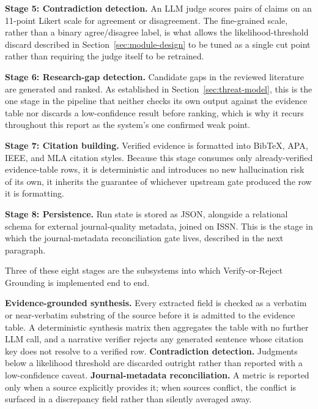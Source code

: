 \documentclass[12pt,a4paper]{report}
\begin{document}
\textbf{Stage 5: Contradiction detection.} An LLM judge scores pairs of
claims on an 11-point Likert scale for agreement or disagreement. The
fine-grained scale, rather than a binary agree/disagree label, is what allows
the likelihood-threshold discard described in Section~\ref{sec:module-design}
to be tuned as a single cut point rather than requiring the judge itself to be
retrained.

\textbf{Stage 6: Research-gap detection.} Candidate gaps in the reviewed
literature are generated and ranked. As established in
Section~\ref{sec:threat-model}, this is the one stage in the pipeline that
neither checks its own output against the evidence table nor discards a
low-confidence result before ranking, which is why it recurs throughout this
report as the system's one confirmed weak point.

\textbf{Stage 7: Citation building.} Verified evidence is formatted into
BibTeX, APA, IEEE, and MLA citation styles. Because this stage consumes only
already-verified evidence-table rows, it is deterministic and introduces no
new hallucination risk of its own, it inherits the guarantee of whichever
upstream gate produced the row it is formatting.

\textbf{Stage 8: Persistence.} Run state is stored as JSON, alongside a
relational schema for external journal-quality metadata, joined on ISSN. This
is the stage in which the journal-metadata reconciliation gate lives,
described in the next paragraph.

Three of these eight stages are the subsystems into which Verify-or-Reject
Grounding is implemented end to end.

\textbf{Evidence-grounded synthesis.} Every extracted field is checked as a
verbatim or near-verbatim substring of the source before it is admitted to the
evidence table. A deterministic synthesis matrix then aggregates the table
with no further LLM call, and a narrative verifier rejects any generated
sentence whose citation key does not resolve to a verified row.
\textbf{Contradiction detection.} Judgments below a likelihood threshold are
discarded outright rather than reported with a low-confidence caveat.
\textbf{Journal-metadata reconciliation.} A metric is reported only when a
source explicitly provides it; when sources conflict, the conflict is surfaced
in a discrepancy field rather than silently averaged away.
\end{document}
